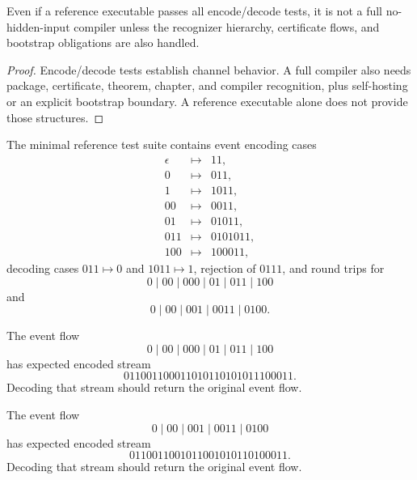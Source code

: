 \begin{proposition}
\label{prop:implementation-interface-reference-not-formal-compiler}
Even if a reference executable passes all encode/decode tests, it is not a full no-hidden-input compiler unless the recognizer hierarchy, certificate flows, and bootstrap obligations are also handled.
\end{proposition}

\begin{proof}
Encode/decode tests establish channel behavior. A full compiler also needs package, certificate, theorem, chapter, and compiler recognition, plus self-hosting or an explicit bootstrap boundary. A reference executable alone does not provide those structures.
\end{proof}

\begin{definition}
\label{def:implementation-interface-reference-test-suite}
The minimal reference test suite contains event encoding cases
$$
\begin{array}{rcl}
  \epsilon &\mapsto& 11,\\
  0 &\mapsto& 011,\\
  1 &\mapsto& 1011,\\
  00 &\mapsto& 0011,\\
  01 &\mapsto& 01011,\\
  011 &\mapsto& 0101011,\\
  100 &\mapsto& 100011,
\end{array}
$$
decoding cases $011\mapsto 0$ and $1011\mapsto 1$, rejection of $0111$, and round trips for
$$
  0\mid 00\mid 000\mid 01\mid 011\mid 100
$$
and
$$
  0\mid 00\mid 001\mid 0011\mid 0100.
$$
\end{definition}

\begin{example}
\label{ex:implementation-interface-completion-roundtrip}
The event flow
$$
  0\mid 00\mid 000\mid 01\mid 011\mid 100
$$
has expected encoded stream
$$
  011001100011010110101011100011.
$$
Decoding that stream should return the original event flow.
\end{example}

\begin{example}
\label{ex:implementation-interface-add-fold-roundtrip}
The event flow
$$
  0\mid 00\mid 001\mid 0011\mid 0100
$$
has expected encoded stream
$$
  0110011001011001010110100011.
$$
Decoding that stream should return the original event flow.
\end{example}

